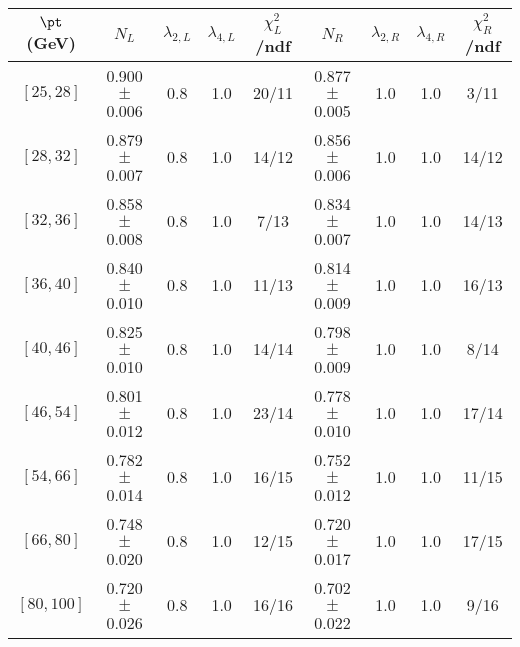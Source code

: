 \begin{tabular}{c||c|c|c|c||c|c|c|c}
$\pt$ (GeV) & $N_L$ & $\lambda_{2,L}$ & $\lambda_{4,L}$  & $\chi^2_L$/ndf & $N_R$ & $\lambda_{2,R}$ & $\lambda_{4,R}$  & $\chi^2_R$/ndf \\
\hline
$[25, 28]$ & 0.900$\pm$0.006 & 0.8 & 1.0 & 20/11 & 0.877$\pm$0.005 & 1.0 & 1.0 & 3/11\\
$[28, 32]$ & 0.879$\pm$0.007 & 0.8 & 1.0 & 14/12 & 0.856$\pm$0.006 & 1.0 & 1.0 & 14/12\\
$[32, 36]$ & 0.858$\pm$0.008 & 0.8 & 1.0 & 7/13 & 0.834$\pm$0.007 & 1.0 & 1.0 & 14/13\\
$[36, 40]$ & 0.840$\pm$0.010 & 0.8 & 1.0 & 11/13 & 0.814$\pm$0.009 & 1.0 & 1.0 & 16/13\\
$[40, 46]$ & 0.825$\pm$0.010 & 0.8 & 1.0 & 14/14 & 0.798$\pm$0.009 & 1.0 & 1.0 & 8/14\\
$[46, 54]$ & 0.801$\pm$0.012 & 0.8 & 1.0 & 23/14 & 0.778$\pm$0.010 & 1.0 & 1.0 & 17/14\\
$[54, 66]$ & 0.782$\pm$0.014 & 0.8 & 1.0 & 16/15 & 0.752$\pm$0.012 & 1.0 & 1.0 & 11/15\\
$[66, 80]$ & 0.748$\pm$0.020 & 0.8 & 1.0 & 12/15 & 0.720$\pm$0.017 & 1.0 & 1.0 & 17/15\\
$[80, 100]$ & 0.720$\pm$0.026 & 0.8 & 1.0 & 16/16 & 0.702$\pm$0.022 & 1.0 & 1.0 & 9/16\\
\end{tabular}
